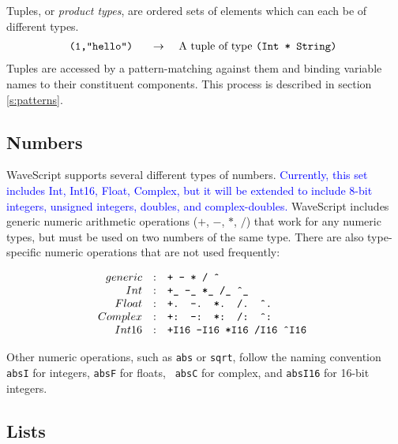 \documentclass[twocolumn]{report}
\newcommand{\rednote}[1]{{\textcolor{blue}{#1}}}
\newcommand{\evalsto}[2]{\[ \begin{array}{rcl}
$\tt #1 $&$ \arr $&$ #2 $
\end{array} \]}
\newcommand{\arr}{\ensuremath{\rightarrow}}
\newenvironment{wscode}{\begin{center}\tt}{\end{center}}
\begin{document}
Tuples, or {\em product types}, are ordered sets of elements which can
each be of different types. 
\evalsto{(1,``hello'')}{A tuple of type {\tt (Int * String)}}
Tuples are accessed by a pattern-matching against them and binding
variable names to their constituent components.  This process is
described in section \ref{s:patterns}.

\subsection{Numbers}

WaveScript supports several different types of numbers.  \rednote{Currently,
this set includes Int, Int16, Float, Complex, but it will be extended
to include 8-bit integers, unsigned integers, doubles, and complex-doubles.}
WaveScript includes generic numeric arithmetic operations ($+$, $-$,
$*$, $/$) that work for any numeric types, but must be used on two
numbers of the same type.  There are also type-specific numeric
operations that are not used frequently:

\[
\begin{array}{rcl}
generic          & : & $\tt + - * / \^{}$   \\
Int              & : & $\tt +\_ -\_ *\_ /\_ \^{}\_ $ \\
Float            & : & $\tt +. -. *. /. \^{}. $ \\
Complex          & : & $\tt +: -: *: /: \^{}: $ \\
Int16            & : & $\tt +I16 -I16 *I16 /I16 \^{}I16 $   \\
\end{array}
\]

Other numeric operations, such as {\tt abs} or {\tt sqrt}, follow the
naming convention {\tt absI} for integers, {\tt absF} for floats, {\tt
absC} for complex, and {\tt absI16} for 16-bit integers.



\subsection{Lists}
\end{document}
